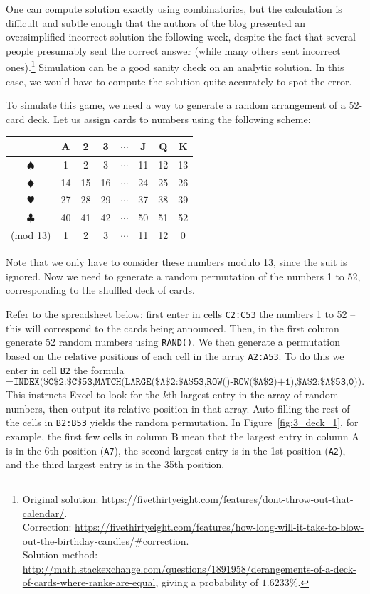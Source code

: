 One can compute solution exactly using combinatorics, but the calculation is difficult and subtle enough that the authors of the blog presented an oversimplified incorrect solution the following week, despite the fact that several people presumably sent the correct answer (while many others sent incorrect ones).\footnote{Original solution: \url{https://fivethirtyeight.com/features/dont-throw-out-that-calendar/}. \\ Correction: {\tiny \url{https://fivethirtyeight.com/features/how-long-will-it-take-to-blow-out-the-birthday-candles/\#correction}}. \\ Solution method: {\tiny \url{http://math.stackexchange.com/questions/1891958/derangements-of-a-deck-of-cards-where-ranks-are-equal}}, giving a probability of $1.6233\%$.}
Simulation can be a good sanity check on an analytic solution.
In this case, we would have to compute the solution quite accurately to spot the error.

To simulate this game, we need a way to generate a random arrangement of a 52-card deck.
Let us assign cards to numbers using the following scheme:

{ \small
\begin{center}	
\begin{tabular}{c|ccccccc}
& A & 2 & 3 & $\cdots$ & J & Q & K \\
\hline
$\spadesuit$ & 1 & 2 & 3 & $\cdots$ & 11 & 12 & 13 \\
$\vardiamond$ & 14 & 15 & 16 & $\cdots$ & 24 & 25 & 26 \\
$\varheart$ & 27 & 28 & 29 & $\cdots$ & 37 & 38 & 39 \\
$\clubsuit$ & 40 & 41 & 42 & $\cdots$ & 50 & 51 & 52 \\
\hline
(mod 13) & 1 & 2 & 3 & $\cdots$ & 11 & 12 & 0 
\end{tabular}
\end{center}
}

Note that we only have to consider these numbers modulo 13, since the suit is ignored.
Now we need to generate a random permutation of the numbers 1 to 52, corresponding to the shuffled deck of cards.

Refer to the spreadsheet below: first enter in cells \texttt{C2:C53} the numbers 1 to 52 -- this will correspond to the cards being announced.
Then, in the first column generate 52 random numbers using \texttt{RAND()}.
We then generate a permutation based on the relative positions of each cell in the array \texttt{A2:A53}.
To do this we enter in cell \texttt{B2} the formula \[\texttt{=INDEX(\$C\$2:\$C\$53,MATCH(LARGE(\$A\$2:\$A\$53,ROW()-ROW(\$A\$2)+1),\$A\$2:\$A\$53,0))}.\]
This instructs Excel to look for the $k$th largest entry in the array of random numbers, then output its relative position in that array.
Auto-filling the rest of the cells in \texttt{B2:B53} yields the random permutation.
In Figure~\ref{fig:3_deck_1}, for example, the first few cells in column B mean that the largest entry in column A is in the 6th position (\texttt{A7}), the second largest entry is in the 1st position (\texttt{A2}), and the third largest entry is in the 35th position.

